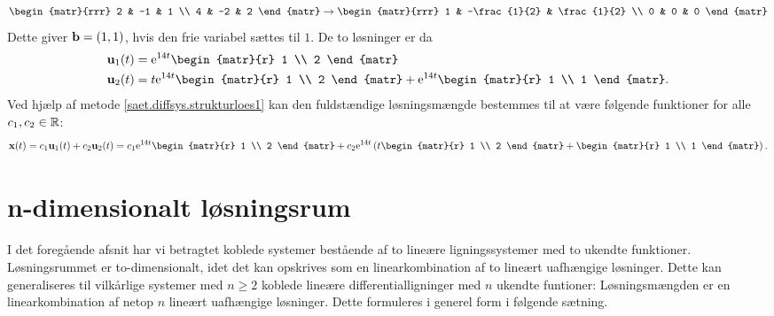 \begin{example}
\begin{equation}
\end{equation}
\begin{equation}
\begin{matr}{rrr} 2 & -1 & 1 \\ 4 & -2 & 2 \end{matr} \rightarrow \begin{matr}{rrr} 1 & -\frac{1}{2} & \frac{1}{2} \\ 0 & 0 & 0 \end{matr}
\end{equation}
Dette giver $ \mathbf{b} = (1, 1) $, hvis den frie variabel sættes til $ 1 $. De to løsninger er da
\begin{equation}
\begin{aligned}
\mathbf u_1(t) &= \e^{14 t} \begin{matr}{r} 1 \\ 2 \end{matr} \\
\mathbf u_2(t) &= t \e^{14 t} \begin{matr}{r} 1 \\ 2 \end{matr} + \e^{14 t} \begin{matr}{r} 1 \\ 1 \end{matr}.
\end{aligned}
\end{equation}
Ved hjælp af metode \ref{saet.diffsys.strukturloes1} kan den fuldstændige løsningsmængde bestemmes til at være følgende funktioner for alle $ c_1,c_2 \in \mathbb{R} $:
\begin{equation}
\mx(t) = c_1\mathbf u_1(t) + c_2\mathbf u_2(t) = c_1 \e^{14 t} \begin{matr}{r} 1 \\ 2 \end{matr} + c_2 \e^{14 t} \left(t \begin{matr}{r} 1 \\ 2 \end{matr} + \begin{matr}{r} 1 \\ 1 \end{matr} \right).
\end{equation}
\end{example}
\section{n-dimensionalt løsningsrum}
I det foregående afsnit har vi betragtet koblede systemer bestående af to lineære ligningssystemer med to ukendte funktioner. Løsningsrummet er to-dimensionalt, idet det kan opskrives som en linearkombination af to lineært uafhængige løsninger. Dette kan generaliseres til vilkårlige systemer med $ n \geq 2 $ koblede lineære differentialligninger med $n$ ukendte funtioner: Løsningsmængden er en linearkombination af netop $ n $ lineært uafhængige løsninger. Dette formuleres i generel form i følgende sætning. %

